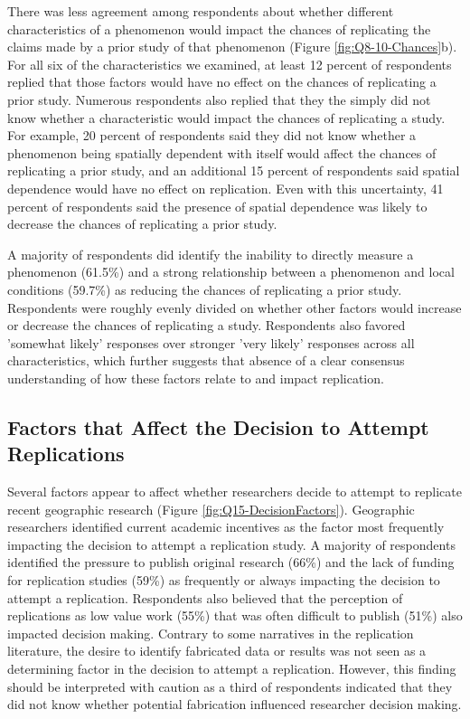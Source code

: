 \documentclass[]{interact}
\theoremstyle{plain}%
\theoremstyle{definition}
\theoremstyle{remark}
\begin{document}
There was less agreement among respondents about whether different characteristics of a phenomenon would impact the chances of replicating the claims made by a prior study of that phenomenon (Figure \ref{fig:Q8-10-Chances}b). 
For all six of the characteristics we examined, at least 12 percent of respondents replied that those factors would have no effect on the chances of replicating a prior study.
Numerous respondents also replied that they the simply did not know whether a characteristic would impact the chances of replicating a study. 
For example, 20 percent of respondents said they did not know whether a phenomenon being spatially dependent with itself would affect the chances of replicating a prior study, and an additional 15 percent of respondents said spatial dependence would have no effect on replication. 
Even with this uncertainty, 41 percent of respondents said the presence of spatial dependence was likely to decrease the chances of replicating a prior study.

A majority of respondents did identify the inability to directly measure a phenomenon (61.5\%) and a strong relationship between a phenomenon and local conditions (59.7\%) as reducing the chances of replicating a prior study.
Respondents were roughly evenly divided on whether other factors would increase or decrease the chances of replicating a study.
Respondents also favored 'somewhat likely' responses over stronger 'very likely' responses across all characteristics, which further suggests that absence of a clear consensus understanding of how these factors relate to and impact replication.


\subsection*{Factors that Affect the Decision to Attempt Replications}
Several factors appear to affect whether researchers decide to attempt to replicate recent geographic research (Figure \ref{fig:Q15-DecisionFactors}).
Geographic researchers identified current academic incentives as the factor most frequently impacting the decision to attempt a replication study. 
A majority of respondents identified the pressure to publish original research (66\%) and the lack of funding for replication studies (59\%) as frequently or always impacting the decision to attempt a replication.
Respondents also believed that the perception of replications as low value work (55\%) that was often difficult to publish (51\%) also impacted decision making.  
Contrary to some narratives in the replication literature, the desire to identify fabricated data or results was not seen as a determining factor in the decision to attempt a replication. 
However, this finding should be interpreted with caution as a third of respondents indicated that they did not know whether potential fabrication influenced researcher decision making.  
\end{document}

